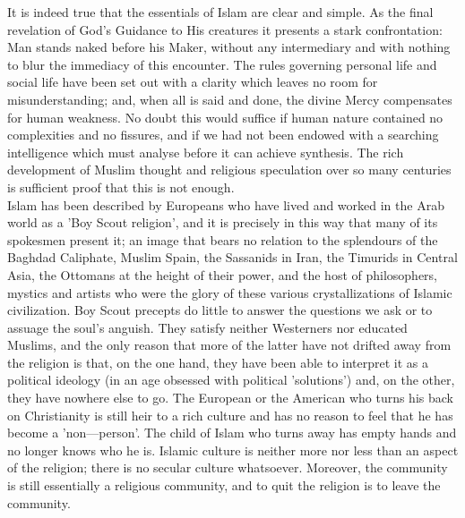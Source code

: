 \documentclass[11pt, b5paper, twoside]{book}
\begin{document}
It is indeed true that the essentials of Islam are clear and simple. As the final revelation of God's Guidance to His creatures it presents a stark confrontation: Man stands naked before his Maker, without any intermediary and with nothing to blur the immediacy of this encounter. The rules governing personal life and social life have been set out with a clarity which leaves no room for misunderstanding; and, when all is said and done, the divine Mercy compensates for human weakness. No doubt this would suffice if human nature contained no complexities and no fissures, and if we had not been endowed with a searching intelligence which must analyse before it can achieve synthesis. The rich development of Muslim thought and religious speculation over so many centuries is sufficient proof that this is not enough. \\

Islam has been described by Europeans who have lived and worked in the Arab world as a 'Boy Scout religion', and it is precisely in this way that many of its spokesmen present it; an image that bears no relation to the splendours of the Baghdad Caliphate, Muslim Spain, the Sassanids in Iran, the Timurids in Central Asia, the Ottomans at the height of their power, and the host of philosophers, mystics and artists who were the glory of these various crystallizations of Islamic civilization. Boy Scout precepts do little to answer the questions we ask or to assuage the soul's anguish. They satisfy neither Westerners nor educated Muslims, and the only reason that more of the latter have not drifted away from the religion is that, on the one hand, they have been able to interpret it as a political ideology (in an age obsessed with political 'solutions') and, on the other, they have nowhere else to go. The European or the American who turns his back on Christianity is still heir to a rich culture and has no reason to feel that he has become a 'non---person'. The child of Islam who turns away has empty hands and no longer knows who he is. Islamic culture is neither more nor less than an aspect of the religion; there is no secular culture whatsoever. Moreover, the community is still essentially a religious community, and to quit the religion is to leave the community. \\
\end{document}
